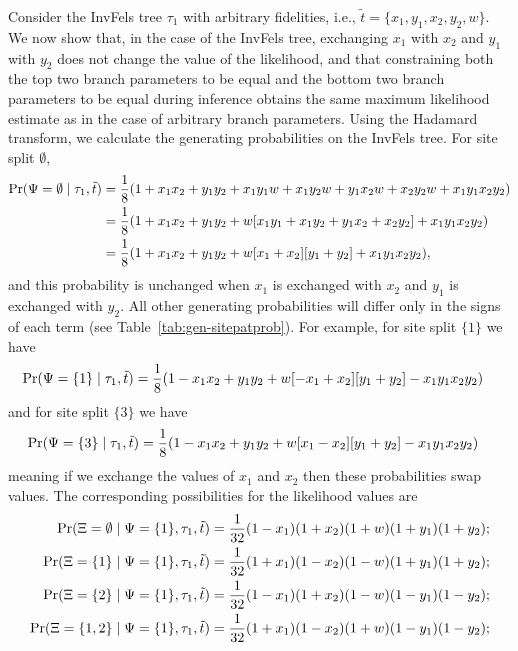 Consider the InvFels tree $\tau_1$ with arbitrary fidelities, i.e., $\tilde{t}=\{x_1,y_1,x_2,y_2,w\}$.
We now show that, in the case of the InvFels tree, exchanging $x_1$ with $x_2$ and $y_1$ with $y_2$ does not change the value of the likelihood, and that constraining both the top two branch parameters to be equal and the bottom two branch parameters to be equal during inference obtains the same maximum likelihood estimate as in the case of arbitrary branch parameters.
Using the Hadamard transform, we calculate the generating probabilities on the InvFels tree.
For site split $\emptyset$,
\begin{align*}
    \Pr(\Psi=\emptyset\mid \tau_1, \tilde{t}) & = \frac{1}{8} (1 + x_1x_2 +  y_1y_2 +  x_1y_1w + x_1y_2w + y_1x_2w + x_2y_2w + x_1y_1x_2y_2) \\
                                              & = \frac{1}{8} (1 + x_1x_2 +  y_1y_2 +  w[x_1y_1 + x_1y_2 + y_1x_2 + x_2y_2] + x_1y_1x_2y_2) \\
                                              & = \frac{1}{8} (1 + x_1x_2 +  y_1y_2 +  w[x_1 + x_2][y_1 + y_2] + x_1y_1x_2y_2),
\end{align*}
and this probability is unchanged when $x_1$ is exchanged with $x_2$ and $y_1$ is exchanged with $y_2$.
All other generating probabilities will differ only in the signs of each term (see Table~\ref{tab:gen-sitepatprob}).
For example, for site split $\{1\}$ we have
\begin{align*}
    \Pr(\Psi=\{1\}\mid \tau_1, \tilde{t}) & = \frac{1}{8} (1 - x_1x_2 +  y_1y_2 +  w[-x_1 + x_2][y_1 + y_2] - x_1y_1x_2y_2)
\end{align*}
and for site split $\{3\}$ we have
\begin{align*}
    \Pr(\Psi=\{3\}\mid \tau_1, \tilde{t}) & = \frac{1}{8} (1 - x_1x_2 +  y_1y_2 +  w[x_1 - x_2][y_1 + y_2] - x_1y_1x_2y_2)
\end{align*}
meaning if we exchange the values of $x_1$ and $x_2$ then these probabilities swap values.
The corresponding possibilities for the likelihood values are
\begin{align*}
    \Pr(\Xi=\emptyset \mid \Psi=\{1\}, \tau_1, \tilde{t}) &= \frac{1}{32}(1-x_1)(1+x_2)(1+w)(1+y_1)(1+y_2); \\
    \Pr(\Xi=\{1\} \mid \Psi=\{1\}, \tau_1, \tilde{t}) &= \frac{1}{32}(1+x_1)(1-x_2)(1-w)(1+y_1)(1+y_2); \\
    \Pr(\Xi=\{2\} \mid \Psi=\{1\}, \tau_1, \tilde{t}) &= \frac{1}{32}(1-x_1)(1+x_2)(1-w)(1-y_1)(1-y_2); \\
    \Pr(\Xi=\{1,2\} \mid \Psi=\{1\}, \tau_1, \tilde{t}) &= \frac{1}{32}(1+x_1)(1-x_2)(1+w)(1-y_1)(1-y_2);
\end{align*}
